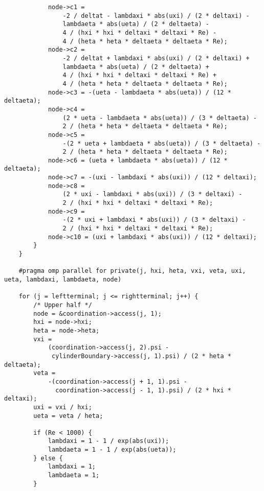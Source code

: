 \documentclass[12pt]{article}
\begin{document}
\begin{itemize}
\begin{lstlisting}
            node->c1 =
                -2 / deltat - lambdaxi * abs(uxi) / (2 * deltaxi) -
                lambdaeta * abs(ueta) / (2 * deltaeta) -
                4 / (hxi * hxi * deltaxi * deltaxi * Re) -
                4 / (heta * heta * deltaeta * deltaeta * Re);
            node->c2 =
                -2 / deltat + lambdaxi * abs(uxi) / (2 * deltaxi) +
                lambdaeta * abs(ueta) / (2 * deltaeta) +
                4 / (hxi * hxi * deltaxi * deltaxi * Re) +
                4 / (heta * heta * deltaeta * deltaeta * Re);
            node->c3 = -(ueta - lambdaeta * abs(ueta)) / (12 * deltaeta);
            node->c4 =
                (2 * ueta - lambdaeta * abs(ueta)) / (3 * deltaeta) -
                2 / (heta * heta * deltaeta * deltaeta * Re);
            node->c5 =
                -(2 * ueta + lambdaeta * abs(ueta)) / (3 * deltaeta) -
                2 / (heta * heta * deltaeta * deltaeta * Re);
            node->c6 = (ueta + lambdaeta * abs(ueta)) / (12 * deltaeta);
            node->c7 = -(uxi - lambdaxi * abs(uxi)) / (12 * deltaxi);
            node->c8 =
                (2 * uxi - lambdaxi * abs(uxi)) / (3 * deltaxi) -
                2 / (hxi * hxi * deltaxi * deltaxi * Re);
            node->c9 =
                -(2 * uxi + lambdaxi * abs(uxi)) / (3 * deltaxi) -
                2 / (hxi * hxi * deltaxi * deltaxi * Re);
            node->c10 = (uxi + lambdaxi * abs(uxi)) / (12 * deltaxi);
        }
    }

    #pragma omp parallel for private(j, hxi, heta, vxi, veta, uxi, ueta, lambdaxi, lambdaeta, node)

    for (j = leftterminal; j <= rightterminal; j++) {
        /* Upper half */
        node = &coordination->access(j, 1);
        hxi = node->hxi;
        heta = node->heta;
        vxi =
            (coordination->access(j, 2).psi -
             cylinderBoundary->access(j, 1).psi) / (2 * heta * deltaeta);
        veta =
            -(coordination->access(j + 1, 1).psi -
              coordination->access(j - 1, 1).psi) / (2 * hxi * deltaxi);
        uxi = vxi / hxi;
        ueta = veta / heta;

        if (Re < 1000) {
            lambdaxi = 1 - 1 / exp(abs(uxi));
            lambdaeta = 1 - 1 / exp(abs(ueta));
        } else {
            lambdaxi = 1;
            lambdaeta = 1;
        }


\end{lstlisting}
\end{itemize}
\end{document}
